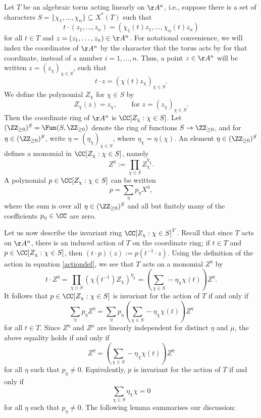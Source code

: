 \documentclass[12pt]{amsart}
\theoremstyle{plain}
\begin{document}
Let $T$ be an algebraic torus acting linearly on $\AA^n$, i.e., suppose there is a set of characters $S = \{\chi_1, \ldots, \chi_n\} \subseteq X^*(T)$ such that
$$t \cdot (z_1, \ldots, z_n) = (\chi_1(t) z_1, \ldots, \chi_n(t) z_n)$$
for all $t \in T$ and $z = (z_1, \ldots, z_n) \in \AA^n$.
For notational convenience, we will index the coordinates of $\AA^n$ by the character that the torus acts by for that coordinate, instead of a number $i=1, \ldots, n$.
Thus, a point $z \in \AA^n$ will be written $z = (z_\chi)_{\chi\in S}$, such that
\begin{equation}\label{actiondef}
t \cdot z = (\chi(t) z_\chi)_{\chi \in S}.
\end{equation}
We define the polynomial $Z_\chi$ for $\chi \in S$ by
$$Z_\chi(z) = z_\chi, \qquad \text{for } z = (z_\chi)_{\chi \in S}.$$
Then the coordinate ring of $\AA^n$ is $\CC[Z_\chi : \chi \in S]$.
Let $(\ZZ_{\ge 0})^S = \Fun(S, \ZZ_{\ge 0})$ denote the ring of functions $S \to \ZZ_{\ge 0}$, and for $\eta \in (\ZZ_{\ge 0})^S$, write $\eta=(\eta_\chi)_{\chi\in S}$, where $\eta_\chi = \eta(\chi)$.
An element $\eta \in (\ZZ_{\ge 0})^S$ defines a monomial in $\CC[Z_\chi : \chi \in S]$, namely
$$Z^\eta := \prod_{\chi \in S} Z_\chi^{\eta_\chi}.$$
A polynomial $p \in \CC[Z_\chi : \chi \in S]$ can be written
$$p = \sum_\eta p_\eta X^\eta,$$
where the sum is over all $\eta \in (\ZZ_{\ge 0})^S$ and all but finitely many of the coefficients $p_\eta \in \CC$ are zero.

Let us now describe the invariant ring $\CC[Z_\chi : \chi \in S]^T$.
Recall that since $T$ acts on $\AA^n$, there is an induced action of $T$ on the coordinate ring;
if $t \in T$ and $p \in \CC[Z_\chi : \chi \in S]$, then $(t\cdot p)(z) := p(t^{-1} \cdot z)$.
Using the definition of the action in equation \ref{actiondef}, we see that $T$ acts on a monomial $Z^\eta$ by
$$t \cdot Z^\eta = \prod_{\chi \in S} (\chi(t^{-1}) Z_\chi)^{\eta_\chi} = \left(\sum_{\chi \in S} - \eta_\chi \chi(t)\right) Z^\eta.$$
It follows that $p \in \CC[Z_\chi : \chi \in S]$ is invariant for the action of $T$ if and only if
$$\sum_\eta p_\eta Z^\eta = \sum_\eta p_\eta \left( \sum_{\chi \in S} - \eta_\chi \chi(t)\right) Z^\eta$$
for all $t \in T$.
Since $Z^\eta$ and $Z^\mu$ are linearly independent for distinct $\eta$ and $\mu$, the above equality holds if and only if 
$$Z^\eta = \left(\sum_{\chi \in S} - \eta_\chi \chi(t)\right) Z^\eta$$
for all $\eta$ such that $p_\eta \ne 0$.
Equivalently, $p$ is invariant for the action of $T$ if and only if
$$\sum_{\chi \in S} \eta_\chi \chi = 0$$
for all $\eta$ such that $p_\eta \ne 0$.
The following lemma summarises our discussion:
\end{document}
